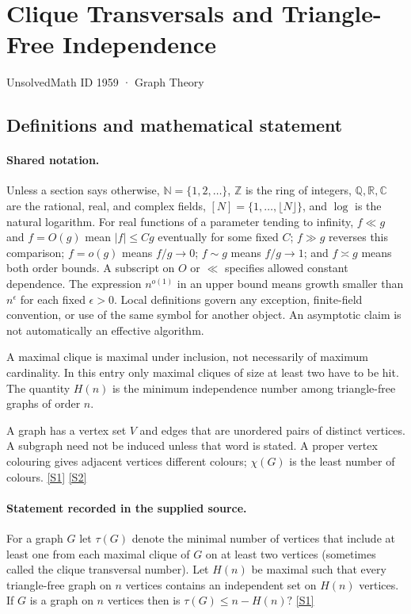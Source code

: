 \documentclass[11pt,a4paper]{article}
\newcommand{\N}{\mathbb{N}}
\newcommand{\Z}{\mathbb{Z}}
\newcommand{\Q}{\mathbb{Q}}
\newcommand{\R}{\mathbb{R}}
\newcommand{\C}{\mathbb{C}}
\newcommand{\sref}[2]{\hyperlink{source:#1:#2}{[S#2]}}
\begin{document}

\setcounter{section}{1958}

\section{Clique Transversals and Triangle-Free Independence}\label{1959}

{\small\sffamily UnsolvedMath ID 1959 · Graph Theory}

\subsection{Definitions and mathematical statement}

\paragraph{Shared notation.}Unless a section says otherwise, $\N=\{1,2,\ldots\}$,
$\Z$ is the ring of integers, $\Q,\R,\C$ are the rational, real, and complex
fields, $[N]=\{1,\ldots,\lfloor N\rfloor\}$, and $\log$ is the natural
logarithm. For real functions of a parameter tending to infinity,
$f\ll g$ and $f=O(g)$ mean $|f|\leq Cg$ eventually for some fixed $C$;
$f\gg g$ reverses this comparison; $f=o(g)$ means $f/g\to0$;
$f\sim g$ means $f/g\to1$; and $f\asymp g$ means both order bounds.
A subscript on $O$ or $\ll$ specifies allowed constant dependence.
The expression $n^{o(1)}$ in an upper bound means growth smaller than
$n^\epsilon$ for each fixed $\epsilon>0$. Local definitions govern any
exception, finite-field convention, or use of the same symbol for another
object. An asymptotic claim is not automatically an effective algorithm.



A maximal clique is maximal under inclusion, not necessarily of maximum cardinality. In this entry only maximal cliques of size at least two have to be hit. The quantity $H(n)$ is the minimum independence number among triangle-free graphs of order $n$.

A graph has a vertex set $V$ and edges that are unordered pairs of distinct vertices. A subgraph need not be induced unless that word is stated. A proper vertex colouring gives adjacent vertices different colours; $\chi(G)$ is the least number of colours. \sref{1959}{1} \sref{1959}{2}

\paragraph{Statement recorded in the supplied source.}
For a graph $G$ let $\tau(G)$ denote the minimal number of vertices that include at least one from each maximal clique of $G$ on at least two vertices (sometimes called the clique transversal number).
Let $H(n)$ be maximal such that every triangle-free graph on $n$ vertices contains an independent set on $H(n)$ vertices.
If $G$ is a graph on $n$ vertices then is $ \tau(G)\leq n-H(n)? $ \sref{1959}{1}
\end{document}
